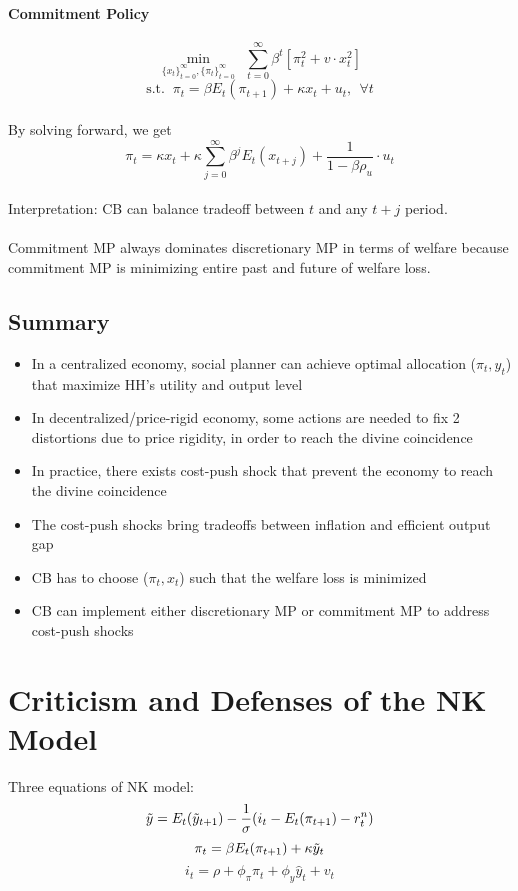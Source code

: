 \documentclass{article}
\begin{document}
\paragraph{Commitment Policy}
$$\min_{\{x_t\}_{t=0}^\infty, \{\pi_t\}_{t=0}^\infty}\ \ \sum_{t=0}^\infty \beta^t [\pi_t^2 + v\cdot x_t^2]$$
$$\text{s.t.  }\ \pi_t = \beta E_t (\pi_{t+1}) + \kappa x_t + u_t,\ \ \forall t$$
\\
By solving forward, we get
$$\pi_t = \kappa x_t +\kappa \sum_{j=0}^\infty \beta^j E_t(x_{t+j}) + \frac{1}{1-\beta\rho_u}\cdot u_t$$
\\
{\color{ForestGreen}Interpretation: CB can balance tradeoff between $t$ and any $t+j$  period.}\\
\\
Commitment MP always dominates discretionary MP in terms of welfare because commitment MP is minimizing entire past and future of welfare loss.\\

\subsection{Summary}
\begin{itemize}
    \item In a centralized economy, social planner can achieve optimal allocation ($\pi_t, y_t$) that maximize HH's utility and output level
    \item In decentralized/price-rigid economy, some actions are needed to fix 2 distortions due to price rigidity, in order to reach the divine coincidence
    \item In practice, there exists cost-push shock that prevent the economy to reach the divine coincidence
    \item The cost-push shocks bring tradeoffs between inflation and efficient output gap
    \item CB has to choose ($\pi_t, x_t$) such that the welfare loss is minimized
    \item CB can implement either discretionary MP or commitment MP to address cost-push shocks
\end{itemize}

\pagebreak


\section{Criticism and Defenses of the NK Model}
Three equations of NK model:
$$\Tilde{y} = E_t(\Tilde{y}_{t+1}) - \frac{1}{\sigma}(i_t - E_t(\pi_{t+1}) - r_t^n)$$
$$\pi_t = \beta E_t(\pi_{t+1}) + \kappa \Tilde{y}_t$$
$$i_t = \rho + \phi_\pi \pi_t + \phi_y \hat{y}_t + v_t$$
\end{document}
